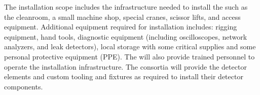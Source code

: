 The installation scope includes the infrastructure needed to install
the  such as the cleanroom, a small machine shop, special
cranes, scissor lifts, and access equipment.  Additional equipment
required for installation includes: rigging equipment, hand tools,
diagnostic equipment (including oscilloscopes, network analyzers, and
leak detectors), local storage with some critical supplies and some
personal protective equipment (PPE). The  will also provide
trained personnel to operate the installation infrastructure. The
consortia will provide the detector elements and custom tooling and
fixtures as required to install their detector components.


 







